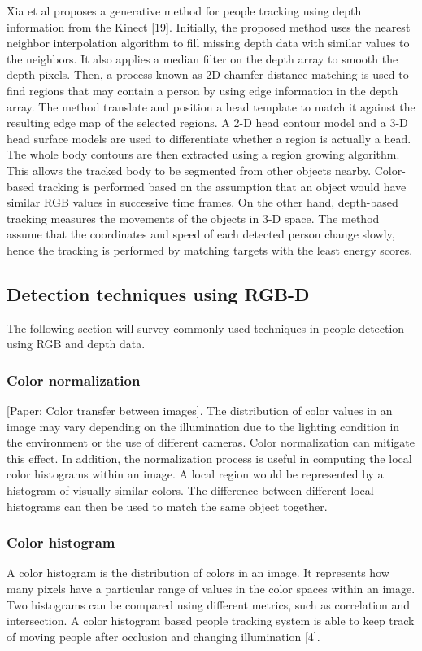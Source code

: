 \documentclass[paper=a4, fontsize=11pt]{scrartcl}
\numberwithin{equation}{section}		%
\numberwithin{figure}{section}			%
\numberwithin{table}{section}				%
\begin{document}
Xia et al proposes a generative method for people tracking using depth information from the Kinect [19]. Initially, the proposed method uses the nearest neighbor interpolation algorithm to fill missing depth data with similar values to the neighbors. It also applies a median filter on the depth array to smooth the depth pixels. Then, a process known as 2D chamfer distance matching is used to find regions that may contain a person by using edge information in the depth array. The method translate and position a head template to match it against the resulting edge map of the selected regions. A 2-D head contour model and a 3-D head surface models are used to differentiate whether a region is actually a head. The whole body contours are then extracted using a region growing algorithm. This allows the tracked body to be segmented from other objects nearby. Color-based tracking is performed based on the assumption that an object would have similar RGB values in successive time frames. On the other hand, depth-based tracking measures the movements of the objects in 3-D space. The method assume that the coordinates and speed of each detected person change slowly, hence the tracking is performed by matching targets with the least energy scores.

\subsection{Detection techniques using RGB-D}

The following section will survey commonly used techniques in people detection using RGB and depth data.

\subsubsection{Color normalization}

[Paper: Color transfer between images]. The distribution of color values in an image may vary depending on the illumination due to the lighting condition in the environment or the use of different cameras. Color normalization can mitigate this effect. In addition, the normalization process is useful in computing the local color histograms within an image. A local region would be represented by a histogram of visually similar colors. The difference between different local histograms can then be used to match the same object together.

\subsubsection{Color histogram}
A color histogram is the distribution of colors in an image. It represents how many pixels have a particular range of values in the color spaces within an image. Two histograms can be compared using different metrics, such as correlation and intersection. A color histogram based people tracking system is able to keep track of moving people after occlusion and changing illumination [4].  
\end{document}
